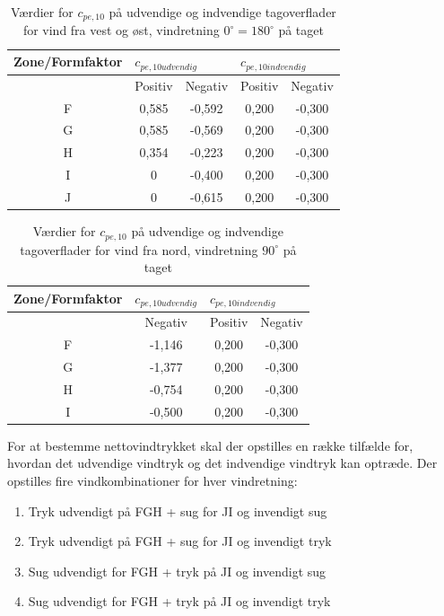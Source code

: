 \begin{table}[htb]
	\begin{center}
		\begin{tabular}{ |c|c|c|c|c| } 
			\hline
			Zone/Formfaktor & \multicolumn{2}{l|}{$c_{pe,10 udvendig}$} & \multicolumn{2}{l|}{$c_{pe,10 indvendig}$} \\	\hline
			& Positiv & Negativ & Positiv & Negativ \\ \hline
			F & 0,585 & -0,592 & 0,200 & -0,300 \\	\hline
			G & 0,585 & -0,569 & 0,200 & -0,300 \\	\hline 
			H & 0,354 & -0,223 & 0,200 & -0,300 \\ 	\hline
			I & 0 & -0,400 & 0,200 & -0,300 \\	\hline
			J & 0 & -0,615 & 0,200 & -0,300 \\	\hline
		\end{tabular}
		\caption{Værdier for $c_{pe,10}$ på udvendige og indvendige tagoverflader for vind fra vest og øst, vindretning $0^{\circ} = 180^{\circ}$ på taget}
		\label{tab:cc}
	\end{center}
\end{table}

\begin{table}[htb]
	\begin{center}
		\begin{tabular}{ |c|c|c|c| } 
			\hline
			Zone/Formfaktor & $c_{pe,10 udvendig}$ & \multicolumn{2}{l|}{$c_{pe,10 indvendig}$} \\	\hline
			& Negativ & Positiv & Negativ \\ \hline
			F & -1,146 & 0,200 & -0,300 \\	\hline
			G & -1,377 & 0,200 & -0,300 \\	\hline 
			H & -0,754 & 0,200 & -0,300 \\ 	\hline
			I & -0,500 & 0,200 & -0,300 \\	\hline
		\end{tabular}
		\caption{Værdier for $c_{pe,10}$ på udvendige og indvendige tagoverflader for vind fra nord, vindretning $90^{\circ}$ på taget}
		\label{tab:kk}
	\end{center}
\end{table}

For at bestemme nettovindtrykket skal der opstilles en række tilfælde for, hvordan det udvendige vindtryk og det indvendige vindtryk kan optræde.  
\newline
\newline
Der opstilles fire vindkombinationer for hver vindretning:
\begin{enumerate}
	\item Tryk udvendigt på FGH + sug for JI og invendigt sug
	\item Tryk udvendigt på FGH + sug for JI og invendigt tryk
	\item Sug udvendigt for FGH + tryk på JI og invendigt sug
	\item Sug udvendigt for FGH + tryk på JI og invendigt tryk
\end{enumerate}

